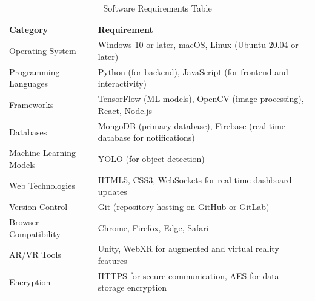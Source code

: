 \documentclass[12pt,a4paper]{report}
\begin{document}
\begin{table}[H]
    \centering
    \begin{tabular}{|l|p{10cm}|}
        \hline
        \textbf{Category} & \textbf{Requirement} \\ \hline
        Operating System & Windows 10 or later, macOS, Linux (Ubuntu 20.04 or later) \\ \hline
        Programming Languages & Python (for backend), JavaScript (for frontend and interactivity) \\ \hline
        Frameworks & TensorFlow (ML models), OpenCV (image processing), React, Node.js \\ \hline
        Databases & MongoDB (primary database), Firebase (real-time database for notifications) \\ \hline
        Machine Learning Models & YOLO (for object detection) \\ \hline
        Web Technologies & HTML5, CSS3, WebSockets for real-time dashboard updates \\ \hline
        Version Control & Git (repository hosting on GitHub or GitLab) \\ \hline
        Browser Compatibility & Chrome, Firefox, Edge, Safari \\ \hline
        AR/VR Tools & Unity, WebXR for augmented and virtual reality features \\ \hline
        Encryption & HTTPS for secure communication, AES for data storage encryption \\ \hline
    \end{tabular}
    \caption{Software Requirements Table}
    \label{tab:software-requirements}
\end{table}
\end{document}
